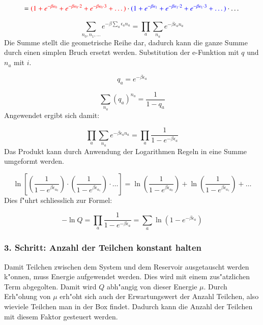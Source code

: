 \begin{refsection}
\begin{equation*}
= \textcolor{red} {(1+e^{- \beta \epsilon_0 }+e^{- \beta \epsilon_0 \cdot 2  }+e^{- \beta \epsilon_0 \cdot 3  }+ \dots)} \cdot \textcolor{blue} {(1+e^{- \beta \epsilon_1 }+e^{- \beta \epsilon_1 \cdot 2  }+e^{- \beta \epsilon_1 \cdot 3  }+ \dots)} \cdot \dots
\end{equation*}

\begin{equation}
\sum\limits_{n_0, n_1, \dots} e^{- \beta \sum_a \epsilon_a n_a } = \prod_{a} \sum_{n_a} e^{- \beta \epsilon_a n_a }
\end{equation}
Die Summe stellt die geometrische Reihe dar, dadurch kann die ganze Summe durch einen simplen Bruch ersetzt werden. Substitution der e-Funktion mit $q$ und $n_a$ mit $i$.

\begin{equation}
q_a = e^{- \beta \epsilon_a}
\end{equation}

\begin{equation}
\sum_{n_a} (q_a)^{n_a} = \frac {1}{1-q_a}
\end{equation}
Angewendet ergibt sich damit:

\begin{equation}
    \prod_{a} \sum_{n_a} e^{- \beta \epsilon_a n_a } = \prod_{a} \frac {1}{1-e^{- \beta \epsilon_a}}
\end{equation}
Das Produkt kann durch Anwendung der Logarithmen Regeln in eine Summe umgeformt werden.

\begin{equation}
\ln \left[ \left( \frac{1}{1-e^{\beta \epsilon_{a_0}}} \right) \cdot \left( \frac{1}{1-e^{ \beta \epsilon_{a_1}}} \right) \cdot \dots \right] = \ln \left( \frac{1}{1-e^{\beta \epsilon_{a_0}}} \right) + \ln \left( \frac{1}{1-e^{\beta \epsilon_{a_1}}} \right) + \dots
\end{equation}
Dies f"uhrt schliesslich zur Formel:

\begin{equation}
- \ln Q = \prod_{a} \frac {1}{1-e^{- \beta \epsilon_a}} = \sum_{a} \ln \left( 1-e^{- \beta \epsilon_a} \right)
\end{equation}

\subsubsection{3. Schritt: Anzahl der Teilchen konstant halten}

Damit Teilchen zwischen dem System und dem Reservoir ausgetauscht werden k"onnen, muss Energie aufgewendet werden.
Dies wird mit einem zus"atzlichen Term abgegolten. Damit wird $Q$ abh"angig von dieser Energie $\mu$. Durch Erh"ohung von $\mu$ erh"oht sich auch der Erwartungswert der Anzahl Teilchen, also wieviele Teilchen man in der Box findet. Dadurch kann die Anzahl der Teilchen mit diesem Faktor gesteuert werden. \cite{bose:feynman}



\end{refsection}
